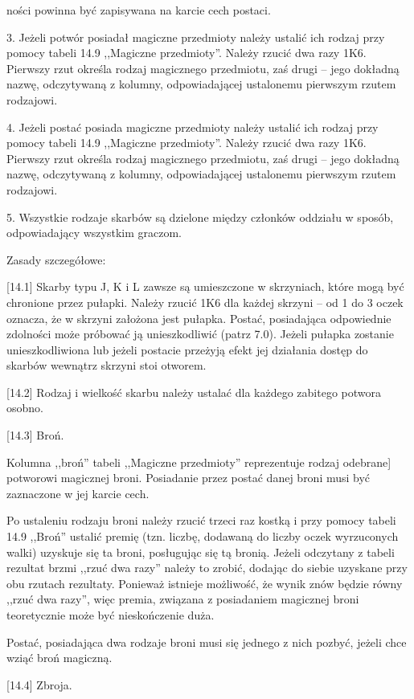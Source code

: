 ności powinna być zapisywana na karcie cech postaci.

3.
Jeżeli potwór posiadał magiczne przedmioty należy ustalić ich rodzaj przy pomocy tabeli 14.9 ,,Magiczne przedmioty''.
Należy rzucić dwa razy 1K6.
Pierwszy rzut określa rodzaj magicznego przedmiotu, zaś drugi – jego dokładną nazwę, odczytywaną z kolumny, odpowiadającej ustalonemu pierwszym rzutem rodzajowi.

4.
Jeżeli postać posiada magiczne przedmioty należy ustalić ich rodzaj przy pomocy tabeli 14.9 ,,Magiczne przedmioty''.
Należy rzucić dwa razy 1K6.
Pierwszy rzut określa rodzaj magicznego przedmiotu, zaś drugi – jego dokładną nazwę, odczytywaną z kolumny, odpowiadającej ustalonemu pierwszym rzutem rodzajowi.

5.
Wszystkie rodzaje skarbów są dzielone między członków oddziału w sposób, odpowiadający wszystkim graczom.

Zasady szczegółowe:

[14.1] Skarby typu J, K i L zawsze są umieszczone w skrzyniach, które mogą być chronione przez pułapki.
Należy rzucić 1K6 dla każdej skrzyni – od 1 do 3 oczek oznacza, że w skrzyni założona jest pułapka.
Postać, posiadająca odpowiednie zdolności może próbować ją unieszkodliwić (patrz 7.0).
Jeżeli pułapka zostanie unieszkodliwiona lub jeżeli postacie przeżyją efekt jej działania dostęp do skarbów wewnątrz skrzyni stoi otworem.

[14.2] Rodzaj i wielkość skarbu należy ustalać dla każdego zabitego potwora osobno.

[14.3] Broń.

Kolumna ,,broń'' tabeli ,,Magiczne przedmioty'' reprezentuje rodzaj odebrane] potworowi magicznej broni.
Posiadanie przez postać danej broni musi być zaznaczone w jej karcie cech.

Po ustaleniu rodzaju broni należy rzucić trzeci raz kostką i przy pomocy tabeli 14.9 ,,Broń'' ustalić premię (tzn. liczbę, dodawaną do liczby oczek wyrzuconych walki) uzyskuje się ta broni, posługując się tą bronią.
Jeżeli odczytany z tabeli rezultat brzmi ,,rzuć dwa razy'' należy to zrobić, dodając do siebie uzyskane przy obu rzutach rezultaty.
Ponieważ istnieje możliwość, że wynik znów będzie równy ,,rzuć dwa razy'', więc premia, związana z posiadaniem magicznej broni teoretycznie może być nieskończenie duża.

Postać, posiadająca dwa rodzaje broni musi się jednego z nich pozbyć, jeżeli chce wziąć broń magiczną.

[14.4] Zbroja.

